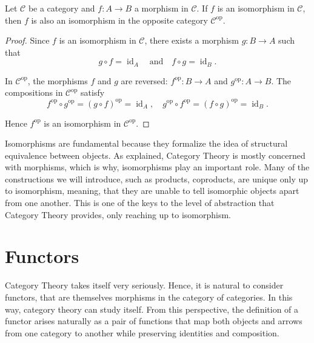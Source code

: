 \begin{proposition}
  \label{prop:iso-dual}
  Let $\mathcal{C}$ be a category and $f: A \to B$ a morphism in $\mathcal{C}$.  
  If $f$ is an isomorphism in $\mathcal{C}$, then $f$ is also an isomorphism in the opposite category $\mathcal{C}^{\mathrm{op}}$.
  \begin{proof}
    Since $f$ is an isomorphism in $\mathcal{C}$, there exists a morphism $g: B \to A$ such that
    \[
      g \circ f = \operatorname{id}_A \quad \text{and} \quad f \circ g = \operatorname{id}_B.
    \]

    In $\mathcal{C}^{\mathrm{op}}$, the morphisms $f$ and $g$ are reversed: $f^{\mathrm{op}}: B \to A$ and $g^{\mathrm{op}}: A \to B$.  
    The compositions in $\mathcal{C}^{\mathrm{op}}$ satisfy
    \[
      f^{\mathrm{op}} \circ g^{\mathrm{op}} = (g \circ f)^{\mathrm{op}} = \operatorname{id}_A, \quad
      g^{\mathrm{op}} \circ f^{\mathrm{op}} = (f \circ g)^{\mathrm{op}} = \operatorname{id}_B.
    \]

    Hence $f^{\mathrm{op}}$ is an isomorphism in $\mathcal{C}^{\mathrm{op}}$.
  \end{proof}

\end{proposition}
Isomorphisms are fundamental because they formalize the idea of structural equivalence between objects. As explained, Category Theory is mostly concerned with morphisms, which is why, isomorphisms play an important role. Many of the constructions we will introduce, such as products, coproducts, are unique only up to isomorphism, meaning, that they are unable to tell isomorphic objects apart from one another. This is one of the keys to the level of abstraction that Category Theory provides,  only reaching up to isomorphism.

\section{\centering Functors}
Category Theory takes itself very seriously. Hence, it is natural to consider functors, that are themselves morphisms in the category of categories. In this way, category theory can study itself. From this perspective, the definition of a functor arises naturally as a pair of functions that map both objects and arrows from one category to another while preserving identities and composition.

